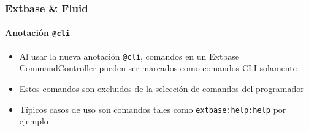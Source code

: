 \begin{frame}[fragile]
	\frametitle{Extbase \& Fluid}
	\framesubtitle{Anotación \texttt{@cli}}

	\begin{itemize}

		\item Al usar la nueva anotación \texttt{@cli}, comandos en un Extbase
			CommandController pueden ser marcados como comandos CLI solamente

		\item Estos comandos son excluidos de la selección de comandos del programador

		\item Típicos casos de uso son comandos tales como \texttt{extbase:help:help} por ejemplo

	\end{itemize}

\end{frame}

